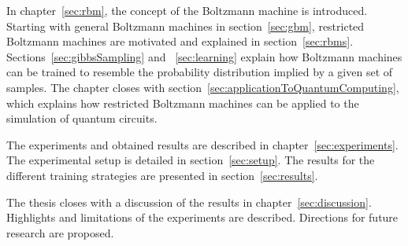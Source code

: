 In chapter~\ref{sec:rbm}, the concept of the Boltzmann machine is introduced. 
Starting with general Boltzmann machines in section~\ref{sec:gbm}, restricted 
Boltzmann machines are motivated and explained in section~\ref{sec:rbms}.
Sections~\ref{sec:gibbsSampling} and ~\ref{sec:learning} explain how 
Boltzmann machines can be trained to resemble the probability distribution implied by a given set of samples.
The chapter closes with section~\ref{sec:applicationToQuantumComputing}, which explains
how restricted Boltzmann machines can be applied to the simulation of quantum circuits.


The experiments and obtained results are described in chapter~\ref{sec:experiments}. 
The experimental setup is detailed in section~\ref{sec:setup}. The results 
for the different training strategies are presented in section~\ref{sec:results}.

The thesis closes with a discussion of the results in chapter~\ref{sec:discussion}.
Highlights and limitations of the experiments are described. 
Directions for future research are proposed.



